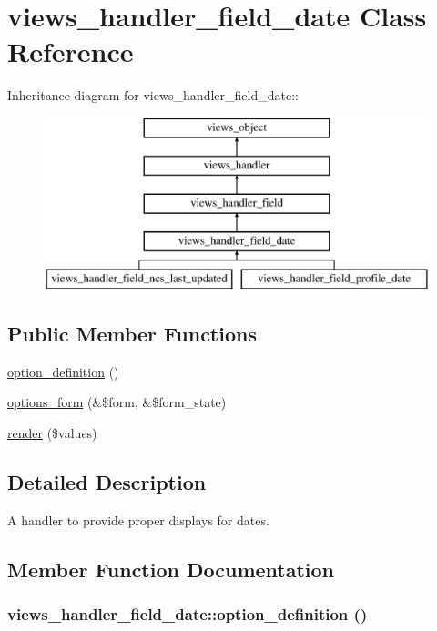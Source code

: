 \hypertarget{classviews__handler__field__date}{
\section{views\_\-handler\_\-field\_\-date Class Reference}
\label{classviews__handler__field__date}
}
Inheritance diagram for views\_\-handler\_\-field\_\-date::\begin{figure}[H]
\begin{center}
\leavevmode
\includegraphics[height=5cm]{classviews__handler__field__date}
\end{center}
\end{figure}
\subsection*{Public Member Functions}
\begin{CompactItemize}
\item 
\hyperlink{classviews__handler__field__date_c2c907d5403ef2085b21619293d701c4}{option\_\-definition} ()
\item 
\hyperlink{classviews__handler__field__date_cc152b1ff3dd0a65bc4d372c97c7c8e0}{options\_\-form} (\&\$form, \&\$form\_\-state)
\item 
\hyperlink{classviews__handler__field__date_4ed821df9270dc90bd3c2103d7136d47}{render} (\$values)
\end{CompactItemize}


\subsection{Detailed Description}
A handler to provide proper displays for dates. 

\subsection{Member Function Documentation}
\hypertarget{classviews__handler__field__date_c2c907d5403ef2085b21619293d701c4}{
\subsubsection[{option\_\-definition}]{\setlength{\rightskip}{0pt plus 5cm}views\_\-handler\_\-field\_\-date::option\_\-definition ()}}
\label{classviews__handler__field__date_c2c907d5403ef2085b21619293d701c4}


